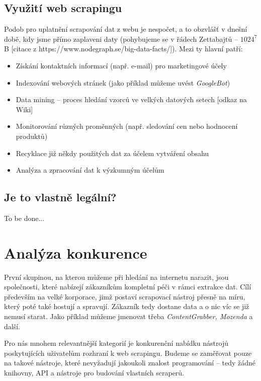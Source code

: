 \documentclass[thesis=B,czech]{FITthesis}[2012/06/26]
\begin{document}
\subsection{Využití web scrapingu}
Podob pro uplatnění scrapování dat z webu je nespočet, a to obzvláš\v{t} v dnešní době, kdy jsme přímo zaplaveni daty (pohybujeme se v řádech Zettabajtů -- $1024^{7}$ B [citace z https://www.nodegraph.se/big-data-facts/]). Mezi ty hlavní patří:
\begin{itemize}
	\item Získání kontaktních informací (např. e-mail) pro marketingové účely
	\item Indexování webových stránek (jako příklad můžeme uvést \emph{GoogleBot})
	\item Data mining -- proces hledání vzorců ve velkých datových setech [odkaz na Wiki]
	\item Monitorování různých proměnných (např. sledování cen nebo hodnocení produktů)
	\item Recyklace již někdy použitých dat za účelem vytváření  obsahu
	\item Analýza a zpracování dat k výzkumným účelům
\end{itemize}

\subsection{Je to vlastně legální?}
To be done...


\newpage
\section{Analýza konkurence}
První skupinou, na kterou můžeme při hledání na internetu narazit, jsou společnosti, které nabízejí zákazníkům kompletní péči v rámci extrakce dat. Cílí především na velké korporace, jimž postaví scrapovací nástroj přesně na míru, který poté také hostují a spravují. Zákazník tedy dostane data a o nic víc se již nemusí starat. Jako příklad můžeme jmenovat třeba \emph{ContentGrabber, Mozenda} a další.

Pro nás mnohem relevantnější kategorií je konkurenční nabídku nástrojů poskytujících uživatelům rozhraní k web scrapingu. Budeme se zaměřovat pouze na takové nástroje, které nevyžadují jakoukoli znalost programování -- tedy žádné knihovny, API a nástroje pro budování vlastních scraperů.
\end{document}
